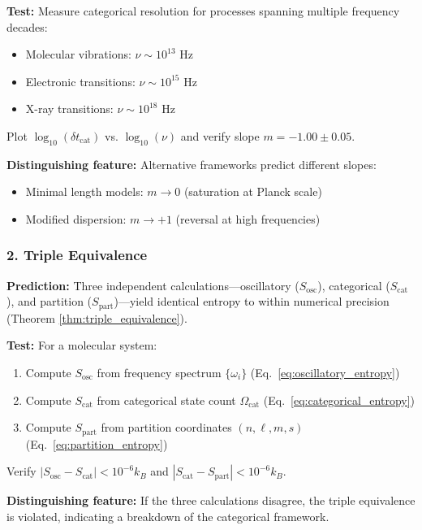 \documentclass[twocolumn,10pt]{article}
\theoremstyle{remark}
\begin{document}
\textbf{Test:} Measure categorical resolution for processes spanning multiple frequency decades:
\begin{itemize}
    \item Molecular vibrations: $\nu \sim 10^{13}$ Hz
    \item Electronic transitions: $\nu \sim 10^{15}$ Hz
    \item X-ray transitions: $\nu \sim 10^{18}$ Hz
\end{itemize}

Plot $\log_{10}(\delta t_{\text{cat}})$ vs. $\log_{10}(\nu)$ and verify slope $m = -1.00 \pm 0.05$.

\textbf{Distinguishing feature:} Alternative frameworks predict different slopes:
\begin{itemize}
    \item Minimal length models: $m \to 0$ (saturation at Planck scale)
    \item Modified dispersion: $m \to +1$ (reversal at high frequencies)
\end{itemize}

\subsubsection{2. Triple Equivalence}

\textbf{Prediction:} Three independent calculations—oscillatory ($S_{\text{osc}}$), categorical ($S_{\text{cat}}$), and partition ($S_{\text{part}}$)—yield identical entropy to within numerical precision (Theorem \ref{thm:triple_equivalence}).

\textbf{Test:} For a molecular system:
\begin{enumerate}
    \item Compute $S_{\text{osc}}$ from frequency spectrum $\{\omega_i\}$ (Eq.~\ref{eq:oscillatory_entropy})
    \item Compute $S_{\text{cat}}$ from categorical state count $\Omega_{\text{cat}}$ (Eq.~\ref{eq:categorical_entropy})
    \item Compute $S_{\text{part}}$ from partition coordinates $(n, \ell, m, s)$ (Eq.~\ref{eq:partition_entropy})
\end{enumerate}

Verify $|S_{\text{osc}} - S_{\text{cat}}| < 10^{-6} k_B$ and $|S_{\text{cat}} - S_{\text{part}}| < 10^{-6} k_B$.

\textbf{Distinguishing feature:} If the three calculations disagree, the triple equivalence is violated, indicating a breakdown of the categorical framework.
\end{document}

